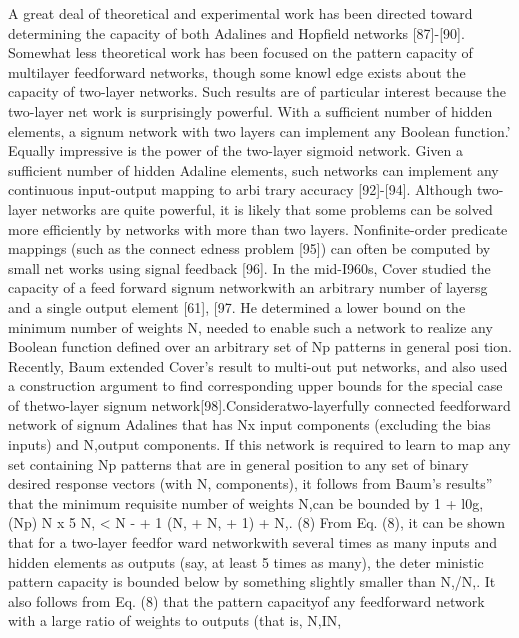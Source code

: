 \documentclass[11pt,a4paper,twocolumn]{article}
\begin{document}
\newpage


A great deal of theoretical and experimental work has 
been directed toward determining the capacity of both 
Adalines and Hopfield networks [87]-[90]. Somewhat less 
theoretical work has been focused on the pattern capacity 
of multilayer feedforward networks, though some knowl
edge exists about the capacity of two-layer networks. Such 
results are of particular interest because the two-layer net
work is surprisingly powerful. With a sufficient number of 
hidden elements, a signum network with two layers can 
implement any Boolean function.’ Equally impressive is the 
power of the two-layer sigmoid network. Given a sufficient 
number of hidden Adaline elements, such networks can 
implement any continuous input-output mapping to arbi
trary accuracy [92]-[94]. Although two-layer networks are 
quite powerful, it is likely that some problems can be solved 
more efficiently by networks with more than two layers. 
Nonfinite-order predicate mappings (such as the connect
edness problem [95]) can often be computed by small net
works using signal feedback [96]. 
In the mid-I960s, Cover studied the capacity of a feed
forward signum networkwith an arbitrary number of layersg 
and a single output element [61], [97. He determined a lower 
bound on the minimum number of weights N, 
needed to 
enable such a network to realize any Boolean function 
defined over an arbitrary set of Np patterns in general posi
tion. Recently, Baum extended Cover’s result to multi-out
put networks, and also used a construction argument to 
find corresponding upper bounds for the special case of 
thetwo-layer signum network[98].Consideratwo-layerfully 
connected feedforward network of signum Adalines that 
has Nx input components (excluding the bias inputs) and 
N,output components. If this network is required to learn 
to map any set containing Np patterns that are in general 
position to any set of binary desired response vectors (with 
N, components), it follows from Baum’s results” that the 
minimum requisite number of weights N,can 
be bounded 
by 
1 + l0g,(Np) 
N x  
5 N, 
< N - + 1 (N, + N, + 1) + N,. 
(8) 
From Eq. (8), it can be shown that for a two-layer feedfor
ward networkwith several times as many inputs and hidden 
elements as outputs (say, at least 5 times as many), the deter
ministic pattern capacity is bounded below by something 
slightly smaller than N,/N,. 
It also follows from Eq. (8) that 
the pattern capacityof any feedforward network with a large 
ratio of weights to outputs (that is, N,IN, 
\end{document}

